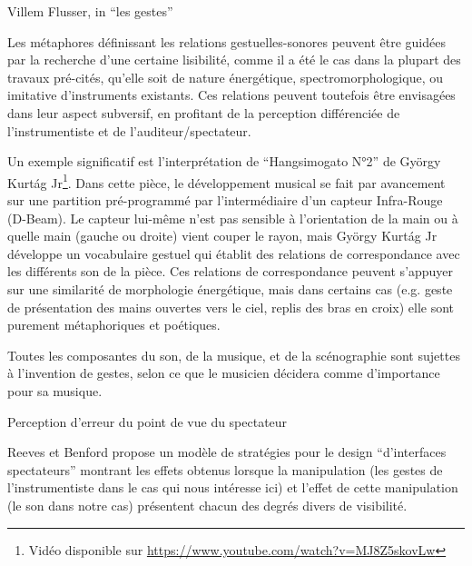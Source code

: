  Villem Flusser, in ``les gestes''


Les métaphores définissant les relations gestuelles-sonores peuvent être guidées par la recherche d'une certaine lisibilité, comme il a été le cas dans la plupart des travaux pré-cités, qu'elle soit de nature énergétique, spectromorphologique, ou imitative d'instruments existants. Ces relations peuvent toutefois être envisagées dans leur aspect subversif, en profitant de la perception différenciée de l'instrumentiste et de l'auditeur/spectateur.

Un exemple significatif est l'interprétation de ``Hangsimogato N°2'' de György Kurtág Jr\footnote{Vidéo disponible sur \url{https://www.youtube.com/watch?v=MJ8Z5skovLw}}. Dans cette pièce, le développement musical se fait par avancement sur une partition pré-programmé par l'intermédiaire d'un capteur Infra-Rouge (D-Beam). Le capteur lui-même n'est pas sensible à l'orientation de la main ou à quelle main (gauche ou droite) vient couper le rayon, mais György Kurtág Jr développe un vocabulaire gestuel qui établit des relations de correspondance avec les différents son de la pièce. Ces relations de correspondance peuvent s'appuyer sur une similarité de morphologie énergétique, mais dans certains cas (e.g. geste de présentation des mains ouvertes vers le ciel, replis des bras en croix) elle sont purement métaphoriques et poétiques.



Toutes les composantes du son, de la musique, et de la scénographie sont sujettes à l'invention de gestes, selon ce que le musicien décidera comme d'importance pour sa musique.



Perception d'erreur du point de vue du spectateur \cite{fyans_ecological_2012}

\cite{emerson_gesture-sound_2018}

Reeves et Benford propose un modèle de stratégies pour le design ``d'interfaces spectateurs'' montrant les effets obtenus lorsque la manipulation (les gestes de l'instrumentiste dans le cas qui nous intéresse ici) et l'effet de cette manipulation (le son dans notre cas) présentent chacun des degrés divers de visibilité.

